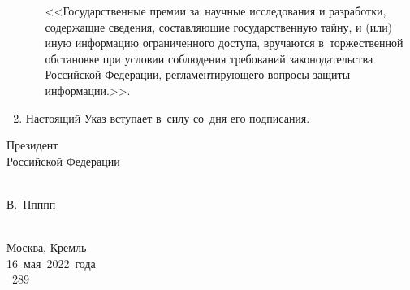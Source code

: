 \documentclass[14pt, a4paper]{extarticle}
\begin{document}
\begin{enumerate}
\begin{enumerate}[label=\asbuk*), ref=\asbuk*]
		<<Государственные премии за~научные исследования и разработки, содержащие сведения, составляющие государственную тайну, и (или) иную информацию ограниченного доступа, вручаются в~торжественной обстановке при условии соблюдения требований законодательства Российской Федерации, регламентирующего вопросы защиты информации.>>.
	\end{enumerate}

	\item Настоящий Указ вступает в~силу со~дня его подписания.
\end{enumerate}

\filbreak
\vspace*{3cm}
\hspace*{3cm}
\begin{minipage}{.4\textwidth}
	\centering \strut
	Президент \\ Российской Федерации
\end{minipage}
\begin{minipage}{.1\textheight}
	\strut \\ В.~Ппппп
\end{minipage}  
\bigskip \\
Москва, Кремль \\
16~мая~2022~года \\
\textnumero~289\nopagebreak[4]
\end{document}
